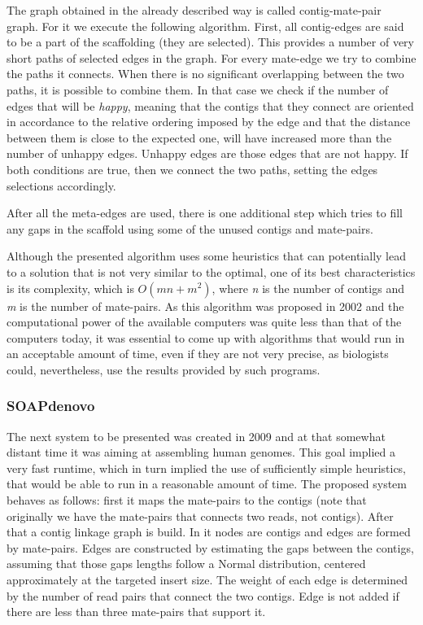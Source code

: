 \documentclass[11pt]{article}
\begin{document}
The graph obtained in the already described way is called contig-mate-pair
graph. For it we execute the following algorithm. First, all contig-edges are
said to be a part of the scaffolding (they are selected). This provides a number
of very short paths of selected edges in the graph. For every mate-edge we try
to combine the paths it connects. When there is no significant overlapping
between the two paths, it is possible to combine them. In that case we check if
the number of edges that will be \emph{happy}, meaning that the contigs that
they connect are oriented in accordance to the relative ordering imposed by the
edge and that the distance between them is close to the expected one, will have
increased more than the number of unhappy edges. Unhappy edges are those edges
that are not happy. If both conditions are true, then we connect the two paths,
setting the edges selections accordingly.

After all the meta-edges are used, there is one additional step which tries to
fill any gaps in the scaffold using some of the unused contigs and mate-pairs.

Although the presented algorithm uses some heuristics that can potentially lead
to a solution that is not very similar to the optimal, one of its best
characteristics is its complexity, which is $O(m n + m ^ 2)$, where \emph{n} is
the number of contigs and \emph{m} is the number of mate-pairs. As this
algorithm was proposed in 2002 and the computational power of the available
computers was quite less than that of the computers today, it was essential to
come up with algorithms that would run in an acceptable amount of time, even if
they are not very precise, as biologists could, nevertheless, use the results
provided by such programs.

\subsubsection{SOAPdenovo} %
\label{ssub:SOAPdenovo}
The next system to be presented \cite{SOAPdenovo} was created in 2009 and at
that somewhat distant time it was aiming at assembling human genomes. This goal
implied a very fast runtime, which in turn implied the use of sufficiently
simple heuristics, that would be able to run in a reasonable amount of time. The
proposed system behaves as follows: first it maps the mate-pairs to the contigs
(note that originally we have the mate-pairs that connects two reads, not
contigs). After that a contig linkage graph is build. In it nodes are contigs
and edges are formed by mate-pairs. Edges are constructed by estimating the gaps
between the contigs, assuming that those gaps lengths follow a Normal
distribution, centered approximately at the targeted insert size. The weight of
each edge is determined by the number of read pairs that connect the two
contigs. Edge is not added if there are less than three mate-pairs that support
it. 
\end{document}
